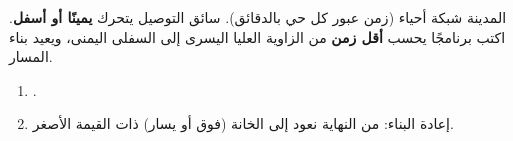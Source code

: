 \begin{statement}
المدينة شبكة أحياء  (زمن عبور كل حي بالدقائق). سائق التوصيل يتحرك \textbf{يمينًا أو أسفل}. اكتب برنامجًا يحسب \textbf{أقل زمن} من الزاوية العليا اليسرى إلى السفلى اليمنى، ويعيد بناء المسار.
\end{statement}
\begin{stepsbox}\begin{enumerate}
\item \par{\centering\small{}\par}.
\item إعادة البناء: من النهاية نعود إلى الخانة (فوق أو يسار) ذات القيمة الأصغر.
\end{enumerate}\end{stepsbox}
